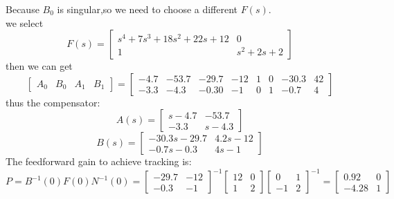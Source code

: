 \documentclass{article}
\begin{document}
Because $B_0$ is singular,so we need to choose a different $F(s)$.\\
we select 
\[
    F(s)=
    \left[
        \begin{array}{cc}
            s^4+7s^3+18s^2+22s+12 & 0\\
            1 & s^2+2s+2
        \end{array}
    \right]    
\]
then we can get 
\[
    \left[ 
        \begin{array}{cccc}
            A_0 & B_0 & A_1 & B_1
        \end{array}
    \right]=\left[
        \begin{array}{cccccccc}
            -4.7 & -53.7 & -29.7 & -12 & 1 & 0 & -30.3 & 42\\
            -3.3 & -4.3 & -0.30 & -1 & 0 & 1 & -0.7 & 4
        \end{array}
    \right]
\]
thus the compensator:
\[
A(s)=\left[ 
    \begin{array}{cc}
        s-4.7 & -53.7\\
        -3.3 & s-4.3
    \end{array}
\right]    
\]
\[ 
    B(s)=\left[ 
        \begin{array}{cc}
            -30.3s-29.7 & 4.2s-12\\
            -0.7s-0.3 & 4s-1
        \end{array}
    \right]   
\]
The feedforward gain to achieve tracking is:
\[ 
P=B^{-1}(0)F(0)N^{-1}(0)=
\left[ 
    \begin{array}{cc}
        -29.7 & -12\\
        -0.3 & -1
    \end{array}
\right]^{-1}
\left[ 
    \begin{array}{cc}
        12 & 0\\
        1 & 2
    \end{array}
\right]
\left[ 
    \begin{array}{cc}
        0 & 1\\
        -1 & 2
    \end{array}
\right]^{-1}
=\left[ 
\begin{array}{cc}
    0.92 & 0\\
    -4.28 & 1
\end{array}
\right]
\]
\end{document}
